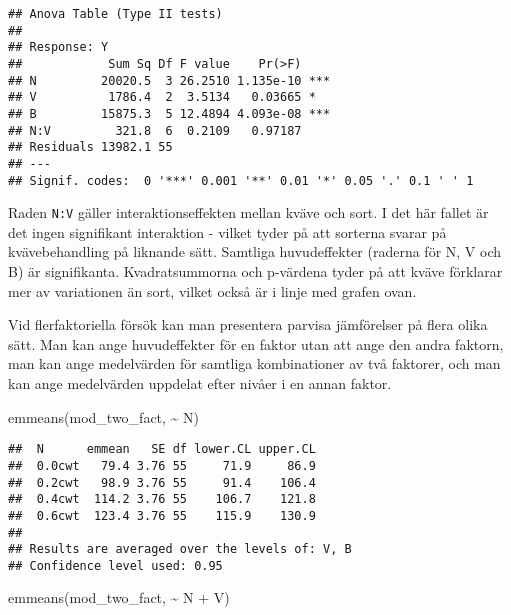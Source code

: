 \documentclass[
]{book}
\newenvironment{Shaded}{\begin{snugshade}}{\end{snugshade}}
\newcommand{\FunctionTok}[1]{\textcolor[rgb]{0.00,0.00,0.00}{#1}}
\newcommand{\NormalTok}[1]{#1}
\newcommand{\SpecialCharTok}[1]{\textcolor[rgb]{0.00,0.00,0.00}{#1}}
\theoremstyle{definition}
\theoremstyle{definition}
\theoremstyle{definition}
\theoremstyle{definition}
\theoremstyle{remark}
\begin{document}
\begin{verbatim}
## Anova Table (Type II tests)
## 
## Response: Y
##            Sum Sq Df F value    Pr(>F)    
## N         20020.5  3 26.2510 1.135e-10 ***
## V          1786.4  2  3.5134   0.03665 *  
## B         15875.3  5 12.4894 4.093e-08 ***
## N:V         321.8  6  0.2109   0.97187    
## Residuals 13982.1 55                      
## ---
## Signif. codes:  0 '***' 0.001 '**' 0.01 '*' 0.05 '.' 0.1 ' ' 1
\end{verbatim}

Raden \texttt{N:V} gäller interaktionseffekten mellan kväve och sort. I det här fallet är det ingen signifikant interaktion - vilket tyder på att sorterna svarar på kvävebehandling på liknande sätt. Samtliga huvudeffekter (raderna för N, V och B) är signifikanta. Kvadratsummorna och p-värdena tyder på att kväve förklarar mer av variationen än sort, vilket också är i linje med grafen ovan.

Vid flerfaktoriella försök kan man presentera parvisa jämförelser på flera olika sätt. Man kan ange huvudeffekter för en faktor utan att ange den andra faktorn, man kan ange medelvärden för samtliga kombinationer av två faktorer, och man kan ange medelvärden uppdelat efter nivåer i en annan faktor.

\begin{Shaded}
\begin{Highlighting}[]
\FunctionTok{emmeans}\NormalTok{(mod\_two\_fact, }\SpecialCharTok{\textasciitilde{}}\NormalTok{ N)}
\end{Highlighting}
\end{Shaded}

\begin{verbatim}
##  N      emmean   SE df lower.CL upper.CL
##  0.0cwt   79.4 3.76 55     71.9     86.9
##  0.2cwt   98.9 3.76 55     91.4    106.4
##  0.4cwt  114.2 3.76 55    106.7    121.8
##  0.6cwt  123.4 3.76 55    115.9    130.9
## 
## Results are averaged over the levels of: V, B 
## Confidence level used: 0.95
\end{verbatim}

\begin{Shaded}
\begin{Highlighting}[]
\FunctionTok{emmeans}\NormalTok{(mod\_two\_fact, }\SpecialCharTok{\textasciitilde{}}\NormalTok{ N }\SpecialCharTok{+}\NormalTok{ V)}
\end{Highlighting}
\end{Shaded}
\end{document}
